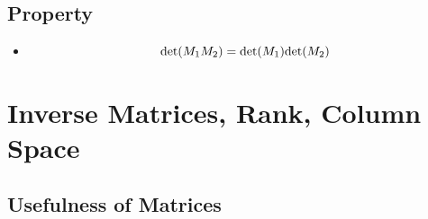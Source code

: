 \documentclass[a4paper]{article}
\begin{document}
\subsection{Property}
\begin{itemize}
	\item \[
		      \text{det}(M_1 M_2) = \text{det}(M_1) \text{det}(M_2) \\
	      \]
\end{itemize}

\newpage
\section{Inverse Matrices, Rank, Column Space}

\subsection{Usefulness of Matrices}
\end{document}
